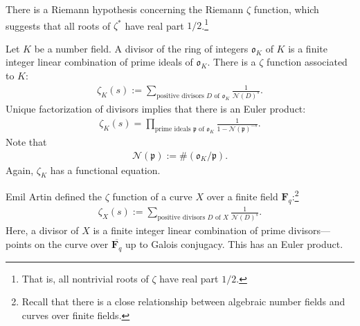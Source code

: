 \documentclass [11 pt, oneside] {article}
\begin{document}
There is a Riemann hypothesis concerning the Riemann $\zeta$ function, which suggests that all roots of $\zeta^*$ have real part $1/2$.\footnote{That is, all nontrivial roots of $\zeta$ have real part $1/2$.}

Let $K$ be a number field. A divisor of the ring of integers $\mathfrak{o}_K$ of $K$ is a finite integer linear combination of prime ideals of $\mathfrak{o}_K$. 
There is a $\zeta$ function associated to $K$:
\begin{align*}
	\zeta_K(s) :=  \sum_{\textrm{positive divisors $D$ of $\mathfrak{o}_K$}}^{}\frac{1}{\mathscr{N}(D)^s}. 
\end{align*}
Unique factorization of divisors implies that there is an Euler product:
\begin{align*}
	\zeta_K(s) = \prod_{\textrm{prime ideals $\mathfrak{p}$ of $\mathfrak{o}_K$}} \frac{1}{1-\mathscr{N}( \mathfrak{p}) ^{-s}}.
\end{align*}
Note that
\begin{align*}
	\mathscr{N}(\mathfrak{p}) := \#(\mathfrak{o}_K/\mathfrak{p}).
\end{align*}
Again, $\zeta_K$ has a functional equation.

Emil Artin defined the $\zeta$ function of a curve $X$ over a finite field $\mathbf{F}_{q}$:\footnote{Recall that there is a close relationship between algebraic number fields and curves over finite fields.}
\begin{align*}
	\zeta_X(s) :=  \sum_{\textrm{positive divisors $D$ of $X$}}^{} \frac{1}{\mathscr{N}(D) ^s}.
\end{align*}
Here, a divisor of $X$ is a finite integer linear combination of prime divisors---points on the curve over $\overline{\mathbf{F}_{q}}$ up to Galois conjugacy.
This has an Euler product.
\end{document}
